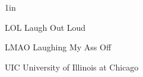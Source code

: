 \begin{list}
{}
{\setlength
   {}{1in}
    \setlength{\leftmargin}{1.5in}
    \setlength{\labelsep}{.5in}
    \setlength{\rightmargin}{\leftmargin}}

\item[LOL\hfill] Laugh Out Loud
\item[LMAO\hfill] Laughing My Ass Off
\item[UIC\hfill] University of Illinois at Chicago
\end{list}